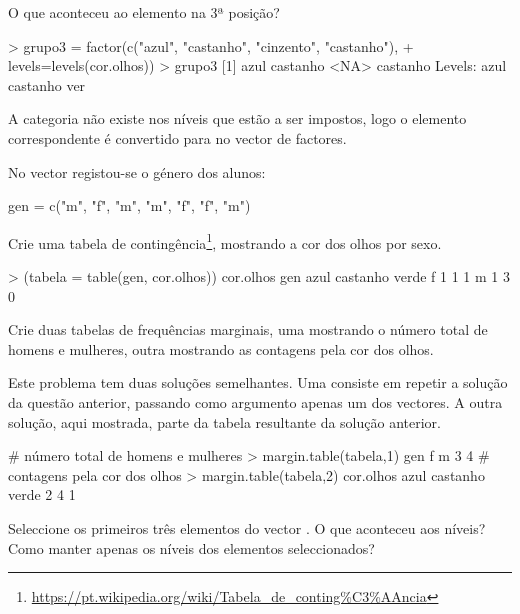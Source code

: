 \documentclass{exam}
\begin{document}
\begin{questions}
O que aconteceu ao elemento na 3ª posição?

\begin{solution}
	\begin{rcode}
		> grupo3 = factor(c("azul", "castanho", "cinzento", "castanho"),
		+ levels=levels(cor.olhos))
		> grupo3
		[1] azul     castanho <NA>     castanho
		Levels: azul castanho ver
	\end{rcode}
	A categoria  não existe nos níveis que estão a ser impostos, logo o elemento correspondente é convertido para  no vector de factores.
\end{solution}

\question No vector  registou-se o género dos alunos:
\begin{rcode}
	gen = c("m", "f", "m", "m", "f", "f", "m")
\end{rcode}

Crie uma tabela de contingência\footnote{\url{https://pt.wikipedia.org/wiki/Tabela_de_conting\%C3\%AAncia}}, mostrando a cor dos olhos por sexo.

\begin{solution}
	\begin{rcode}
		> (tabela = table(gen, cor.olhos))
		cor.olhos
		gen azul castanho verde
		f    1        1     1
		m    1        3     0
	\end{rcode}
\end{solution}

\question Crie duas tabelas de frequências marginais, uma mostrando o número total de homens e mulheres, outra mostrando as contagens pela cor dos olhos.

\begin{solution}
	Este problema tem duas soluções semelhantes. Uma consiste em repetir a solução da questão anterior, passando como argumento apenas um dos vectores. A outra solução, aqui mostrada, parte da tabela resultante da solução anterior.
	\begin{rcode}
		# número total de homens e mulheres
		> margin.table(tabela,1)
		gen
		f m 
		3 4 
		# contagens pela cor dos olhos
		> margin.table(tabela,2)
		cor.olhos
		azul castanho    verde 
		2        4        1 
	\end{rcode}
\end{solution}

\question Seleccione os primeiros três elementos do vector . O que aconteceu aos níveis? Como manter apenas os níveis dos elementos seleccionados?


\end{questions}
\end{document}
